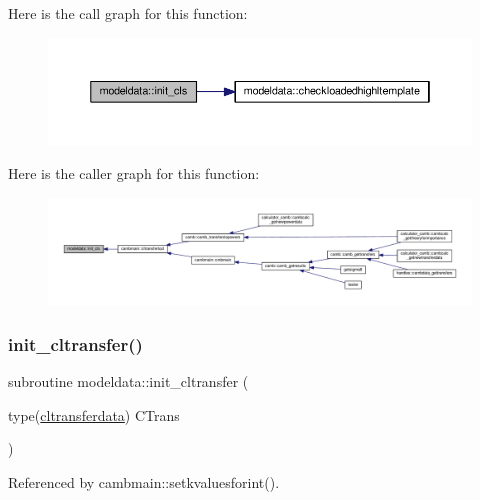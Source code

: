 Here is the call graph for this function\+:
\nopagebreak
\begin{figure}[H]
\begin{center}
\leavevmode
\includegraphics[width=350pt]{namespacemodeldata_a3b4fcde7e9343acbea6dd3d7b52aba10_cgraph}
\end{center}
\end{figure}
Here is the caller graph for this function\+:
\nopagebreak
\begin{figure}[H]
\begin{center}
\leavevmode
\includegraphics[width=350pt]{namespacemodeldata_a3b4fcde7e9343acbea6dd3d7b52aba10_icgraph}
\end{center}
\end{figure}
\mbox{\label{namespacemodeldata_aafb7870d44b0d4146bad72673d70223f}} 
\subsubsection{\texorpdfstring{init\+\_\+cltransfer()}{init\_cltransfer()}}
{\footnotesize\ttfamily subroutine modeldata\+::init\+\_\+cltransfer (\begin{DoxyParamCaption}\item[{type(\mbox{\hyperlink{structmodeldata_1_1cltransferdata}{cltransferdata}})}]{C\+Trans }\end{DoxyParamCaption})}



Referenced by cambmain\+::setkvaluesforint().

